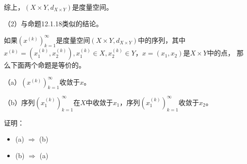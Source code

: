 \documentclass{article}
\begin{document}
综上，$(X \times Y, d_{X \times Y})$是度量空间。

（2）与命题12.1.18类似的结论。

如果$(x^{(k)})_{k = 1}^\infty$是度量空间$(X \times Y, d_{X \times Y})$中的序列，其中
$x^{(k)} = (x_1^{(k)}, x_2^{(k)}), x_1^{(k)} \in X, x_2^{(k)} \in Y$，$x = (x_1, x_2)$是$X \times Y$中的点，
那么下面两个命题是等价的。

（a）$(x^{(k)})_{k = 1}^\infty$收敛于$x$。

（b）序列$(x_1^{(k)})_{k = 1}^\infty$在$X$中收敛于$x_1$，序列$(x_1^{(k)})_{k = 1}^\infty$收敛于$x_2$。

证明：

\begin{itemize}
  \item (a) $\Rightarrow$ (b)



  \item (b) $\Rightarrow$ (a)
\end{itemize}
\end{document}
